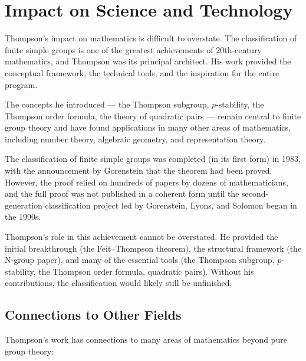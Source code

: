 \section{Impact on Science and Technology}

Thompson's impact on mathematics is difficult to overstate. The classification of finite simple groups is one of the greatest achievements of 20th-century mathematics, and Thompson was its principal architect. His work provided the conceptual framework, the technical tools, and the inspiration for the entire program.

The concepts he introduced --- the Thompson subgroup, \(p\)-stability, the Thompson order formula, the theory of quadratic pairs --- remain central to finite group theory and have found applications in many other areas of mathematics, including number theory, algebraic geometry, and representation theory.

The classification of finite simple groups was completed (in its first form) in 1983, with the announcement by Gorenstein that the theorem had been proved. However, the proof relied on hundreds of papers by dozens of mathematicians, and the full proof was not published in a coherent form until the second-generation classification project led by Gorenstein, Lyons, and Solomon began in the 1990s.

Thompson's role in this achievement cannot be overstated. He provided the initial breakthrough (the Feit--Thompson theorem), the structural framework (the N-group paper), and many of the essential tools (the Thompson subgroup, \(p\)-stability, the Thompson order formula, quadratic pairs). Without his contributions, the classification would likely still be unfinished.

\subsection{Connections to Other Fields}

Thompson's work has connections to many areas of mathematics beyond pure group theory:

